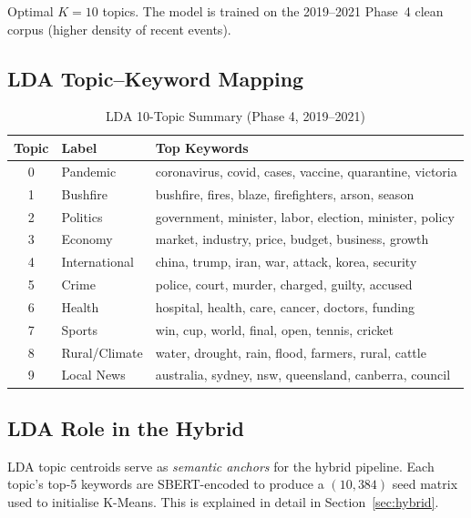 \documentclass[12pt,a4paper]{article}
\begin{document}
Optimal $K{=}10$ topics. The model is trained on the 2019--2021 Phase~4 clean corpus
(higher density of recent events).

\subsection{LDA Topic–Keyword Mapping}

\begin{table}[H]
\centering
\caption{LDA 10-Topic Summary (Phase 4, 2019--2021)}
\begin{tabular}{clp{9cm}}
\toprule
\textbf{Topic} & \textbf{Label} & \textbf{Top Keywords} \\
\midrule
0 & Pandemic         & coronavirus, covid, cases, vaccine, quarantine, victoria \\
1 & Bushfire         & bushfire, fires, blaze, firefighters, arson, season \\
2 & Politics         & government, minister, labor, election, minister, policy \\
3 & Economy          & market, industry, price, budget, business, growth \\
4 & International    & china, trump, iran, war, attack, korea, security \\
5 & Crime            & police, court, murder, charged, guilty, accused \\
6 & Health           & hospital, health, care, cancer, doctors, funding \\
7 & Sports           & win, cup, world, final, open, tennis, cricket \\
8 & Rural/Climate    & water, drought, rain, flood, farmers, rural, cattle \\
9 & Local News       & australia, sydney, nsw, queensland, canberra, council \\
\bottomrule
\end{tabular}
\label{tab:lda_topics}
\end{table}

\subsection{LDA Role in the Hybrid}

LDA topic centroids serve as \emph{semantic anchors} for the hybrid pipeline.
Each topic's top-5 keywords are SBERT-encoded to produce a $(10, 384)$ seed matrix
used to initialise K-Means. This is explained in detail in Section~\ref{sec:hybrid}.

\end{document}
